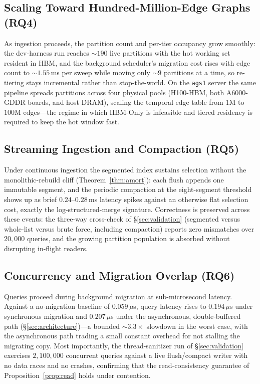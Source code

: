 \documentclass[10pt]{article}
\theoremstyle{definition}
\begin{document}
\subsection{Scaling Toward Hundred-Million-Edge Graphs (RQ4)}
\label{sec:rq4}

As ingestion proceeds, the partition count and per-tier occupancy grow smoothly:
the dev-harness run reaches ${\sim}190$ live partitions with the hot working set
resident in HBM, and the background scheduler's migration cost rises with edge count
to ${\sim}1.55$\,ms per sweep while moving only ${\sim}9$ partitions at a time, so
re-tiering stays incremental rather than stop-the-world. On the \texttt{ags1} server
the same pipeline spreads partitions across four physical pools (H100-HBM, both
A6000-GDDR boards, and host DRAM), scaling the temporal-edge table from $1$M to
$100$M edges---the regime in which HBM-Only is infeasible and tiered residency is
required to keep the hot window fast.

\subsection{Streaming Ingestion and Compaction (RQ5)}
\label{sec:rq5}

Under continuous ingestion the segmented index sustains selection without the
monolithic-rebuild cliff (Theorem~\ref{thm:amort}): each flush appends one immutable
segment, and the periodic compaction at the eight-segment threshold shows up as
brief $0.24$--$0.28$\,ms latency spikes against an otherwise flat selection cost,
exactly the log-structured-merge signature. Correctness is preserved across these
events: the three-way cross-check of \S\ref{sec:validation} (segmented versus
whole-list versus brute force, including compaction) reports zero mismatches over
$20{,}000$ queries, and the growing partition population is absorbed without
disrupting in-flight readers.

\subsection{Concurrency and Migration Overlap (RQ6)}
\label{sec:rq6}

Queries proceed during background migration at sub-microsecond latency. Against a
no-migration baseline of $0.059\,\mu$s, query latency rises to $0.194\,\mu$s under
synchronous migration and $0.207\,\mu$s under the asynchronous, double-buffered path
(\S\ref{sec:architecture})---a bounded ${\sim}3.3\times$ slowdown in the worst case,
with the asynchronous path trading a small constant overhead for not stalling the
migrating copy. Most importantly, the thread-sanitizer run of \S\ref{sec:validation}
exercises $2{,}100{,}000$ concurrent queries against a live flush/compact writer with
no data races and no crashes, confirming that the read-consistency guarantee of
Proposition~\ref{prop:read} holds under contention.
\end{document}
